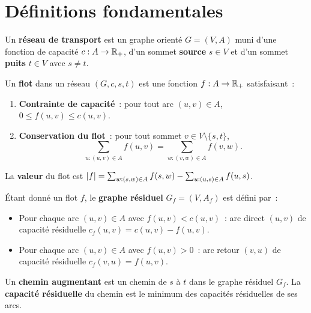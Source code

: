 \section{D\'efinitions fondamentales}

\begin{definition}
Un \textbf{r\'eseau de transport} est un graphe orient\'e $G = (V, A)$ muni
d'une fonction de capacit\'e $c : A \to \mathbb{R}_+$, d'un sommet \textbf{source}
$s \in V$ et d'un sommet \textbf{puits} $t \in V$ avec $s \ne t$.
\end{definition}

\begin{definition}[Flot]
Un \textbf{flot} dans un r\'eseau $(G, c, s, t)$ est une fonction
$f : A \to \mathbb{R}_+$ satisfaisant~:
\begin{enumerate}
  \item \textbf{Contrainte de capacit\'e}~: pour tout arc $(u,v) \in A$,
        $0 \leq f(u,v) \leq c(u,v)$.
  \item \textbf{Conservation du flot}~: pour tout sommet $v \in V
        \setminus \{s, t\}$,
        \[
          \sum_{u : (u,v) \in A} f(u,v) = \sum_{w : (v,w) \in A} f(v,w).
        \]
\end{enumerate}
La \textbf{valeur} du flot est $\left| f \right| = \sum_{w : (s,w) \in A} f(s,w)
- \sum_{u : (u,s) \in A} f(u,s)$.
\end{definition}

\begin{definition}
\'Etant donn\'e un flot $f$, le \textbf{graphe r\'esiduel} $G_f = (V, A_f)$ est
d\'efini par~:
\begin{itemize}
  \item Pour chaque arc $(u,v) \in A$ avec $f(u,v) < c(u,v)$~: arc direct
        $(u,v)$ de capacit\'e r\'esiduelle $c_f(u,v) = c(u,v) - f(u,v)$.
  \item Pour chaque arc $(u,v) \in A$ avec $f(u,v) > 0$~: arc retour
        $(v,u)$ de capacit\'e r\'esiduelle $c_f(v,u) = f(u,v)$.
\end{itemize}
\end{definition}

\begin{definition}
Un \textbf{chemin augmentant} est un chemin de $s$ \`a $t$ dans le graphe
r\'esiduel $G_f$. La \textbf{capacit\'e r\'esiduelle} du chemin est le minimum
des capacit\'es r\'esiduelles de ses arcs.
\end{definition}

